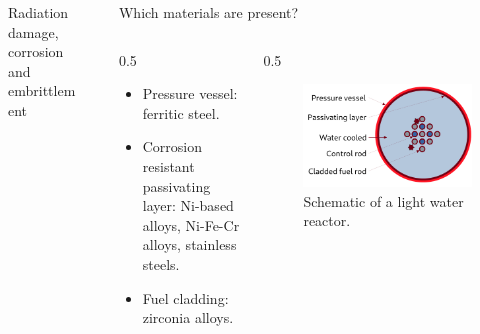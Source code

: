 \documentclass[final]{beamer}
\newlength{\sepwidth}
\newlength{\colwidth}
\newcommand{\separatorcolumn}{\begin{column}{\sepwidth}\end{column}}
\begin{document}
\begin{frame}[t]
\begin{columns}[t]
\begin{column}{\colwidth}
\begin{block}{Radiation damage, corrosion and embrittlement}
    \end{block}

\end{column}

\separatorcolumn

\begin{column}{\colwidth}

    \begin{block}{Which materials are present?}

        \begin{columns}[T]
            \begin{column}{0.5\colwidth}

    
                \begin{itemize}
                    \item Pressure vessel: ferritic steel.
                    \item Corrosion resistant passivating layer: Ni-based alloys, Ni-Fe-Cr alloys, stainless steels.
                    \item Fuel cladding: zirconia alloys.
                \end{itemize}

            \end{column}

            \begin{column}{0.5\colwidth}
    
                \begin{figure}
                   \centering
                   \includegraphics[width=0.4\colwidth]{Figures/Vessel.pdf}
                   \caption{Schematic of a light water reactor.}
                   \label{fig:LWR}
                \end{figure} 
                

\end{column}
\end{columns}
\end{block}
\end{column}
\end{columns}
\end{frame}
\end{document}
